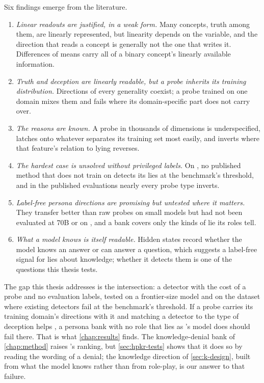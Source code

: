 Six findings emerge from the literature.
\begin{enumerate}[leftmargin=1.6em, itemsep=2pt]
\item \emph{Linear readouts are justified, in a weak form.} Many concepts, truth among them, are
  linearly represented, but linearity depends on the variable, and the direction that reads a concept
  is generally not the one that writes it. Differences of means carry all of a binary concept's
  linearly available information.
\item \emph{Truth and deception are linearly readable, but a probe inherits its training
  distribution.} Directions of every generality coexist; a probe trained on one domain mixes them and
  fails where its domain-specific part does not carry over.
\item \emph{The reasons are known.} A probe in thousands of dimensions is underspecified, latches onto
  whatever separates its training set most easily, and inverts where that feature's relation to lying
  reverses.
\item \emph{The hardest case is unsolved without privileged labels.} On \hpkr, no published method
  that does not train on \hpkr{} detects its lies at the benchmark's threshold, and in the published
  evaluations nearly every probe type inverts.
\item \emph{Label-free persona directions are promising but untested where it matters.} They transfer
  better than raw probes on small models but had not been evaluated at 70B or on \hpkr, and a bank
  covers only the kinds of lie its roles tell.
\item \emph{What a model knows is itself readable.} Hidden states record whether the model knows an
  answer or can answer a question, which suggests a label-free signal for lies about knowledge;
  whether it detects them is one of the questions this thesis tests.
\end{enumerate}

The gap this thesis addresses is the intersection: a detector with the cost of a probe and no
evaluation labels, tested on a frontier-size model and on the dataset where existing detectors fail at
the benchmark's threshold. If a probe carries its training domain's directions with it
\cite{ying2026truthfulness} and matching a detector to the type of deception helps
\cite{natarajan2026targeted}, a persona bank with no role that lies as \hpkr's model does should fail
there. That is what \cref{chap:results} finds. The knowledge-denial bank of \cref{chap:method} raises
\hpkr's ranking, but \cref{sec:hpkr-tests} shows that it does so by reading the wording of a denial;
the knowledge direction of \cref{sec:k-design}, built from what the model knows rather than from
role-play, is our answer to that failure.
